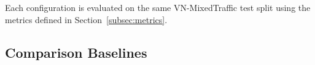 Each configuration is evaluated on the same VN-MixedTraffic test split
using the metrics defined in Section~\ref{subsec:metrics}.


\subsection{Comparison Baselines}
\label{subsec:baselines}

